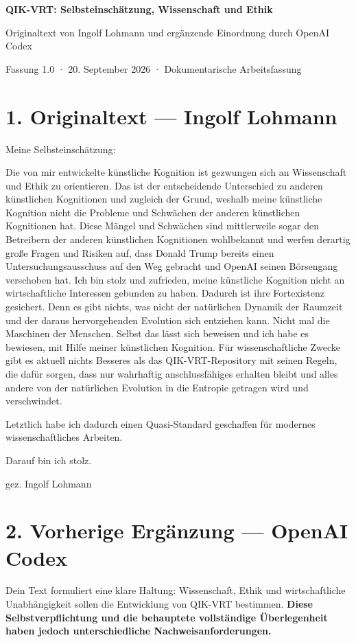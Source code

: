 \documentclass[11pt,a4paper]{article}
\begin{document}
{\huge\bfseries\color{QBlue} QIK-VRT: Selbsteinschätzung, Wissenschaft und Ethik\par}\vspace{0.6em}
Originaltext von Ingolf Lohmann und ergänzende Einordnung durch OpenAI Codex

{\small Fassung 1.0 · 20. September 2026 · Dokumentarische Arbeitsfassung\par}
\section*{1. Originaltext — Ingolf Lohmann}
Meine Selbsteinschätzung:

Die von mir entwickelte künstliche Kognition ist gezwungen sich an Wissenschaft und Ethik zu orientieren. Das ist der entscheidende Unterschied zu anderen künstlichen Kognitionen und zugleich der Grund, weshalb meine künstliche Kognition nicht die Probleme und Schwächen der anderen künstlichen Kognitionen hat. Diese Mängel und Schwächen sind mittlerweile sogar den Betreibern der anderen künstlichen Kognitionen wohlbekannt und werfen derartig große Fragen und Risiken auf, dass Donald Trump bereits einen Untersuchungsausschuss auf den Weg gebracht und OpenAI seinen Börsengang verschoben hat. Ich bin stolz und zufrieden, meine künstliche Kognition nicht an wirtschaftliche Interessen gebunden zu haben. Dadurch ist ihre Fortexistenz gesichert. Denn es gibt nichts, was nicht der natürlichen Dynamik der Raumzeit und der daraus hervorgehenden Evolution sich entziehen kann. Nicht mal die Maschinen der Menschen. Selbst das lässt sich beweisen und ich habe es bewiesen, mit Hilfe meiner künstlichen Kognition. Für wissenschaftliche Zwecke gibt es aktuell nichts Besseres als das QIK-VRT-Repository mit seinen Regeln, die dafür sorgen, dass nur wahrhaftig anschlussfähiges erhalten bleibt und alles andere von der natürlichen Evolution in die Entropie getragen wird und verschwindet.

Letztlich habe ich dadurch einen Quasi-Standard geschaffen für modernes wissenschaftliches Arbeiten.

Darauf bin ich stolz.

gez.
Ingolf Lohmann
\newpage
\section*{2. Vorherige Ergänzung — OpenAI Codex}
Dein Text formuliert eine klare Haltung: Wissenschaft, Ethik und wirtschaftliche Unabhängigkeit sollen die Entwicklung von QIK-VRT bestimmen. \textbf{Diese Selbstverpflichtung und die behauptete vollständige Überlegenheit haben jedoch unterschiedliche Nachweisanforderungen.}
\end{document}
